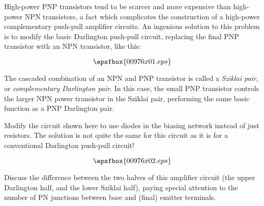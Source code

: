 

High-power PNP transistors tend to be scarcer and more expensive than high-power NPN transistors, a fact which complicates the construction of a high-power complementary push-pull amplifier circuits.  An ingenious solution to this problem is to modify the basic Darlington push-pull circuit, replacing the final PNP transistor with an NPN transistor, like this:

$$\epsfbox{00976x01.eps}$$

The cascaded combination of an NPN and PNP transistor is called a {\it Sziklai pair}, or {\it complementary Darlington pair}.  In this case, the small PNP transistor controls the larger NPN power transistor in the Sziklai pair, performing the same basic function as a PNP Darlington pair.

Modify the circuit shown here to use diodes in the biasing network instead of just resistors.  The solution is not quite the same for this circuit as it is for a conventional Darlington push-pull circuit!







$$\epsfbox{00976x02.eps}$$







Discuss the difference between the two halves of this amplifier circuit (the upper Darlington half, and the lower Sziklai half), paying special attention to the number of PN junctions between base and (final) emitter terminals.




